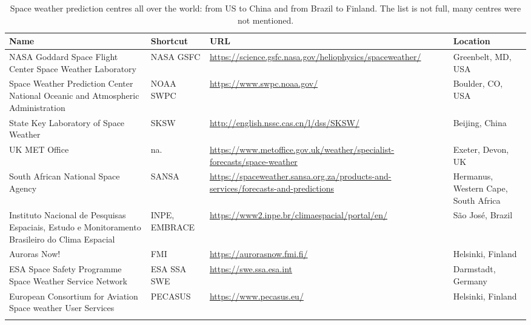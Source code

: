 \documentclass[sn-aps]{sn-jnl}%
\begin{document}

\pagebreak

\begin{table}[h]
\centering
\begin{tabular}[c]{p{3cm}p{1.2cm}p{3.25cm}p{1.75cm}}
Name & Shortcut & URL & Location \\                    
\hline
\hline 
NASA Goddard Space Flight Center Space Weather Laboratory & NASA GSFC & \url{https://science.gsfc.nasa.gov/heliophysics/spaceweather/} & Greenbelt, MD, USA \\
\hline
Space Weather Prediction Center National Oceanic and Atmospheric Administration & NOAA SWPC & \url{https://www.swpc.noaa.gov/} & Boulder, CO, USA\\
\hline
State Key Laboratory of Space Weather & SKSW & \url{http://english.nssc.cas.cn/l/dss/SKSW/} & Beijing, China\\
\hline
UK MET Office & na. & \url{https://www.metoffice.gov.uk/weather/specialist-forecasts/space-weather} & Exeter, Devon, UK\\
\hline
South African National Space Agency & SANSA & \url{https://spaceweather.sansa.org.za/products-and-services/forecasts-and-predictions} & Hermanus, Western Cape, South Africa \\
\hline
Instituto Nacional de Pesquisas Espaciais, Estudo e Monitoramento Brasileiro do Clima Espacial & INPE, EMBRACE & \url{https://www2.inpe.br/climaespacial/portal/en/} & S{\~a}o Jos{\'e}, Brazil \\  
\hline  
Auroras Now! & FMI & \url{https://aurorasnow.fmi.fi/} & Helsinki, Finland\\
\hline 
ESA Space Safety Programme Space Weather Service Network & ESA SSA SWE & \url{https://swe.ssa.esa.int} & Darmstadt, Germany\\
\hline
European Consortium for Aviation Space weather User Services & PECASUS & \url{https://www.pecasus.eu/} & Helsinki, Finland \\ \\
\end{tabular}
\caption[Forecast organisations.]{Space weather prediction centres all over the world: from US to China and from Brazil to Finland. The list is not full, many centres were not mentioned.}
\label{tab:agencies}
\end{table}

\pagebreak
\end{document}

